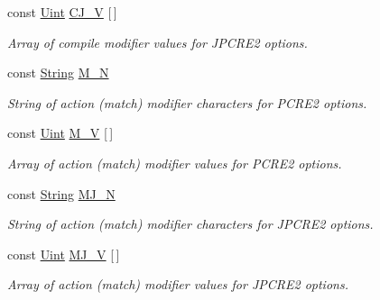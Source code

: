 \begin{DoxyCompactItemize}
const \hyperlink{namespacejpcre2_a078242d38221a13fb3543b9edd78c099}{Uint} \hyperlink{namespacejpcre2_1_1MOD_a455f33361efc25e03e5a8613de8a0fa0}{C\+J\+\_\+V} \mbox{[}$\,$\mbox{]}
\begin{DoxyCompactList}\small\item\em Array of compile modifier values for J\+P\+C\+R\+E2 options. \end{DoxyCompactList}\item 
\hypertarget{namespacejpcre2_1_1MOD_ae9029cd8600f49ba50ae0c7e42804a91}{}\label{namespacejpcre2_1_1MOD_ae9029cd8600f49ba50ae0c7e42804a91} 
const \hyperlink{namespacejpcre2_a91f03070152fb228bc116c5a737f1d16}{String} \hyperlink{namespacejpcre2_1_1MOD_ae9029cd8600f49ba50ae0c7e42804a91}{M\+\_\+N}
\begin{DoxyCompactList}\small\item\em String of action (match) modifier characters for P\+C\+R\+E2 options. \end{DoxyCompactList}\item 
\hypertarget{namespacejpcre2_1_1MOD_a7dd2150647fee002204e7005aa126289}{}\label{namespacejpcre2_1_1MOD_a7dd2150647fee002204e7005aa126289} 
const \hyperlink{namespacejpcre2_a078242d38221a13fb3543b9edd78c099}{Uint} \hyperlink{namespacejpcre2_1_1MOD_a7dd2150647fee002204e7005aa126289}{M\+\_\+V} \mbox{[}$\,$\mbox{]}
\begin{DoxyCompactList}\small\item\em Array of action (match) modifier values for P\+C\+R\+E2 options. \end{DoxyCompactList}\item 
\hypertarget{namespacejpcre2_1_1MOD_a079cc9fcb1e7eeab134b2146d4d67fe8}{}\label{namespacejpcre2_1_1MOD_a079cc9fcb1e7eeab134b2146d4d67fe8} 
const \hyperlink{namespacejpcre2_a91f03070152fb228bc116c5a737f1d16}{String} \hyperlink{namespacejpcre2_1_1MOD_a079cc9fcb1e7eeab134b2146d4d67fe8}{M\+J\+\_\+N}
\begin{DoxyCompactList}\small\item\em String of action (match) modifier characters for J\+P\+C\+R\+E2 options. \end{DoxyCompactList}\item 
\hypertarget{namespacejpcre2_1_1MOD_a02e60618af8087b9a99ae8fbed0b887c}{}\label{namespacejpcre2_1_1MOD_a02e60618af8087b9a99ae8fbed0b887c} 
const \hyperlink{namespacejpcre2_a078242d38221a13fb3543b9edd78c099}{Uint} \hyperlink{namespacejpcre2_1_1MOD_a02e60618af8087b9a99ae8fbed0b887c}{M\+J\+\_\+V} \mbox{[}$\,$\mbox{]}
\begin{DoxyCompactList}\small\item\em Array of action (match) modifier values for J\+P\+C\+R\+E2 options. \end{DoxyCompactList}\item 

\end{DoxyCompactItemize}
